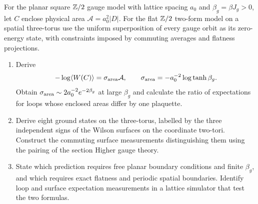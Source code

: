 \begin{exercise}
For the planar square $\mathbb Z/2$ gauge model with lattice spacing $a_0$
and $\beta_g=\beta J_g>0$, let $C$ enclose physical area
$\mathcal A=a_0^2|D|$. For the flat $\mathbb Z/2$ two-form model on a
spatial three-torus use the uniform superposition of every gauge
orbit as its zero-energy state, with constraints imposed by
commuting averages and flatness projections.
\begin{enumerate}[label=(\alph*)]
\item Derive
\[
 -\log\langle W(C)\rangle=\sigma_{\rm area}\mathcal A,\qquad
 \sigma_{\rm area}=-a_0^{-2}\log\tanh\beta_g.
\]
Obtain $\sigma_{\rm area}\sim2a_0^{-2}e^{-2\beta_g}$ at large
$\beta_g$ and calculate the ratio of expectations for loops
whose enclosed areas differ by one plaquette.
\item Derive eight ground states on the three-torus, labelled
by the three independent signs of the Wilson surfaces on
the coordinate two-tori. Construct the commuting surface
measurements distinguishing them using the pairing of the
section Higher gauge theory.
\item State which prediction requires free planar boundary
conditions and finite $\beta_g$, and which requires exact
flatness and periodic spatial boundaries. Identify loop and
surface expectation measurements in a lattice simulator that
test the two formulas.
\end{enumerate}
\end{exercise}
